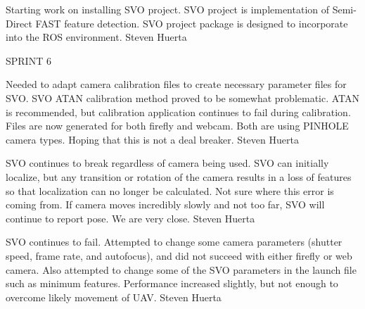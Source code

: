 \begin{description}
\item [2/29/16]  Starting work on installing SVO project. SVO project is implementation of Semi-Direct FAST feature detection. SVO project package is designed to incorporate into the ROS environment. \hfill{Steven Huerta}

\item SPRINT 6

\item [3/21/16]  Needed to adapt camera calibration files to create necessary parameter files for SVO. SVO ATAN calibration method proved to be somewhat problematic. ATAN is recommended, but calibration application continues to fail during calibration. Files are now generated for both firefly and webcam. Both are using PINHOLE camera types. Hoping that this is not a deal breaker.  \hfill{Steven Huerta}

\item [3/28/16]  SVO continues to break regardless of camera being used. SVO can initially localize, but any transition or rotation of the camera results in a loss of features so that localization can no longer be calculated. Not sure where this error is coming from. If camera moves incredibly slowly and not too far, SVO will continue to report pose. We are very close.  \hfill{Steven Huerta}


\item [4/4/16] SVO continues to fail. Attempted to change some camera parameters (shutter speed, frame rate, and autofocus), and did not succeed with either firefly or web camera. Also attempted to change some of the SVO parameters in the launch file such as minimum features. Performance increased slightly, but not enough to overcome likely movement of UAV.  \hfill{Steven Huerta}
\end{description}